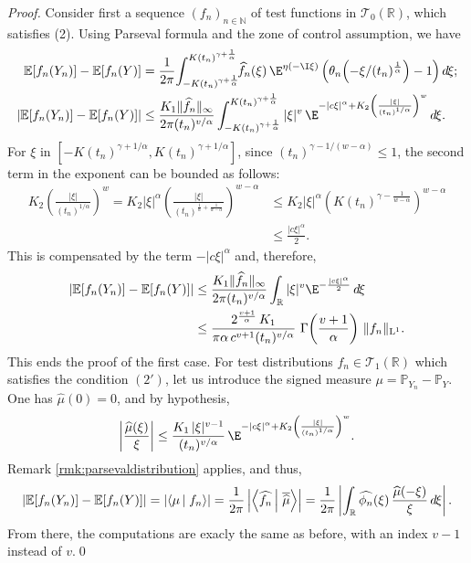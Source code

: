 \documentclass[envcountsame]{svmult}
\newcommand{\N}{\mathbb{N}}
\newcommand{\R}{\mathbb{R}}
\newcommand{\esper}{\mathbb{E}}
\newcommand{\proba}{\mathbb{P}}
\newcommand{\leb}{\mathrm{L}}
\newcommand{\testf}{\mathscr{T}}
\newcommand{\scal}[2]{\left\langle #1\vphantom{#2}\,\right |\left.#2 \vphantom{#1}\right\rangle}
\newcommand{\DD}[1]{\,d\hspace*{-0.3mm}{#1}}
\begin{document}
\begin{proof}
Consider first a sequence $(f_n)_{n \in \N}$ of test functions in $\testf_0(\R)$, which satisfies (2). Using Parseval formula and the zone of control assumption, we have
\begin{align*}
\esper[f_n(Y_n)]-\esper[f_n(Y)] &= \frac{1}{2\pi} \!\int_{-K(t_n)^{\gamma+\frac{1}{\alpha}}}^{K(t_n)^{\gamma+\frac{1}{\alpha}}} \!\!\widehat{f}_n(\xi)\,\E^{\eta(-\I\xi)}\left(\theta_n\!\left(-\xi/(t_n)^{\frac{1}{\alpha}}\right)-1\right)\!\DD{\xi};\\
|\esper[f_n(Y_n)]-\esper[f_n(Y)]| &\leq \frac{K_1\|\widehat{f}_n\|_\infty}{2\pi (t_n)^{v/\alpha}} \int_{-K(t_n)^{\gamma+\frac{1}{\alpha}}}^{K(t_n)^{\gamma+\frac{1}{\alpha}}} |\xi|^v\,\E^{-|c\xi|^\alpha + K_2 \left(\frac{|\xi|}{(t_n)^{1/\alpha}}\right)^w} \DD{\xi}.
\end{align*}
For $\xi$ in $[-K(t_n)^{\gamma+1/\alpha},K(t_n)^{\gamma+1/\alpha}]$,
since $(t_n)^{\gamma-1/(w-\alpha)}\leq 1$,
the second term in the exponent can be bounded as follows:
\begin{align*}
K_2 \left(\frac{|\xi|}{(t_n)^{1/\alpha}}\right)^w = K_2 |\xi|^{\alpha} \left(\frac{|\xi|}{(t_n)^{\frac{1}{\alpha}+\frac{1}{w-\alpha}}}\right)^{w-\alpha} &\leq K_2 |\xi|^{\alpha} \left(K (t_n)^{\gamma-\frac{1}{w-\alpha}}\right)^{w-\alpha} \\
&\leq \frac{|c\xi|^\alpha}{2}.
\end{align*}
This is compensated by the term $-|c\xi|^\alpha$ and, therefore,
\begin{align*}
|\esper[f_n(Y_n)]-\esper[f_n(Y)]| &\leq \frac{K_1\|\widehat{f}_n\|_\infty}{2\pi (t_n)^{v/\alpha}}\int_{\R} |\xi|^v \E^{-\frac{|c\xi|^\alpha}{2}}\DD{\xi} \\
&\leq \frac{2^{\frac{v+1}{\alpha}}\,K_1}{\pi\alpha\,c^{v+1} (t_n)^{v/\alpha}}\,\,\Gamma\!\left(\frac{v+1}{\alpha}\right)\,\|f_n\|_{\leb^1}.
\end{align*}
This ends the proof of the first case. For test distributions $f_n \in \testf_1(\R)$ which satisfies the condition $(2')$, let us introduce the signed measure $\mu = \proba_{Y_n}-\proba_Y$. One has $\widehat{\mu}(0)=0$, and by hypothesis, 
$$\left|\frac{\widehat{\mu}(\xi)}{\xi}\right| \leq \frac{K_1\,|\xi|^{v-1}}{(t_n)^{v/\alpha}}\,\E^{-|c\xi|^\alpha+K_2\left(\frac{|\xi|}{(t_n)^{1/\alpha}}\right)^w}.$$
Remark \ref{rmk:parsevaldistribution} applies, and thus,
$$|\esper[f_n(Y_n)]-\esper[f_n(Y)]|=\left|\scal{\mu}{f_n}\right| = \frac{1}{2\pi}\left|\scal{ \widehat{f_n}}{\overline{\widehat{\mu}}}\right| = \frac{1}{2\pi}\left|\int_{\R} \widehat{\phi_n}(\xi)\,\frac{\widehat{\mu}(-\xi)}{\xi}\DD{\xi}\right| .$$
From there, the computations are exacly the same as before, with an index $v-1$ instead of $v$.\qed
\end{proof}
\end{document}
